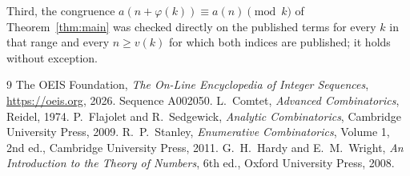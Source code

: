 \documentclass[11pt,a4paper]{article}
\theoremstyle{plain}
\theoremstyle{definition}
\begin{document}
Third, the congruence $a(n+\varphi(k))\equiv a(n)\pmod k$ of Theorem~\ref{thm:main} was
checked directly on the published terms for every $k$ in that range and every $n\ge v(k)$
for which both indices are published; it holds without exception.

\begin{thebibliography}{9}
 The OEIS Foundation, \emph{The On-Line Encyclopedia of Integer
Sequences}, \url{https://oeis.org}, 2026. Sequence A002050.
 L.~Comtet, \emph{Advanced Combinatorics}, Reidel, 1974.
 P.~Flajolet and R.~Sedgewick, \emph{Analytic Combinatorics}, Cambridge
University Press, 2009.
 R.~P.~Stanley, \emph{Enumerative Combinatorics}, Volume 1, 2nd ed.,
Cambridge University Press, 2011.
 G.~H.~Hardy and E.~M.~Wright, \emph{An Introduction to the Theory of
Numbers}, 6th ed., Oxford University Press, 2008.
\end{thebibliography}
\end{document}
